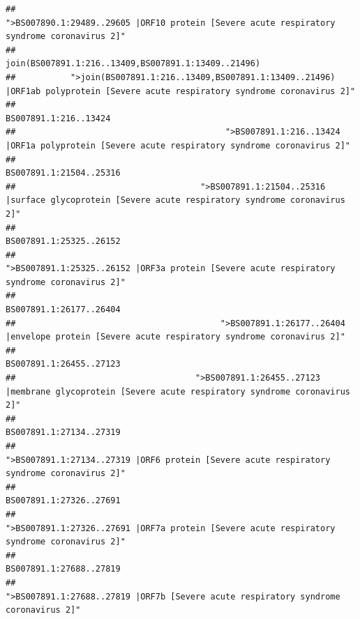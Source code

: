 \documentclass[
]{article}
\begin{document}
\begin{verbatim}
##                                            ">BS007890.1:29489..29605 |ORF10 protein [Severe acute respiratory syndrome coronavirus 2]" 
##                                                                                    join(BS007891.1:216..13409,BS007891.1:13409..21496) 
##           ">join(BS007891.1:216..13409,BS007891.1:13409..21496) |ORF1ab polyprotein [Severe acute respiratory syndrome coronavirus 2]" 
##                                                                                                                  BS007891.1:216..13424 
##                                          ">BS007891.1:216..13424 |ORF1a polyprotein [Severe acute respiratory syndrome coronavirus 2]" 
##                                                                                                                BS007891.1:21504..25316 
##                                     ">BS007891.1:21504..25316 |surface glycoprotein [Severe acute respiratory syndrome coronavirus 2]" 
##                                                                                                                BS007891.1:25325..26152 
##                                            ">BS007891.1:25325..26152 |ORF3a protein [Severe acute respiratory syndrome coronavirus 2]" 
##                                                                                                                BS007891.1:26177..26404 
##                                         ">BS007891.1:26177..26404 |envelope protein [Severe acute respiratory syndrome coronavirus 2]" 
##                                                                                                                BS007891.1:26455..27123 
##                                    ">BS007891.1:26455..27123 |membrane glycoprotein [Severe acute respiratory syndrome coronavirus 2]" 
##                                                                                                                BS007891.1:27134..27319 
##                                             ">BS007891.1:27134..27319 |ORF6 protein [Severe acute respiratory syndrome coronavirus 2]" 
##                                                                                                                BS007891.1:27326..27691 
##                                            ">BS007891.1:27326..27691 |ORF7a protein [Severe acute respiratory syndrome coronavirus 2]" 
##                                                                                                                BS007891.1:27688..27819 
##                                                    ">BS007891.1:27688..27819 |ORF7b [Severe acute respiratory syndrome coronavirus 2]" 

\end{verbatim}
\end{document}
